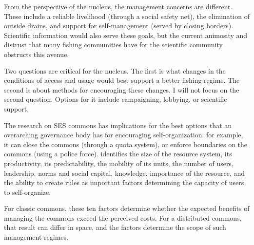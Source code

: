 \documentclass[12pt, oneside]{amsart}
\begin{document}
 
From the perspective of the nucleus, the management concerns are different.  These include a reliable livelihood (through a social safety net), the elimination of outside drains, and support for self-management (served by closing borders).  Scientific information would also serve these goals, but the current animosity and distrust that many fishing communities have for the scientific community obstructs this avenue.

Two questions are critical for the nucleus.  The first is what changes in the conditions of access and usage would best support a better fishing regime.  The second is about methods for encouraging these changes.  I will not focus on the second question.  Options for it include campaigning, lobbying, or scientific support.

The research on SES commons has implications for the best options that an overarching governance body has for encouraging self-organization: for example, it can close the commons (through a quota system), or enforce boundaries on the commons (using a police force).  \citet{ostrom2009general} identifies the size of the resource system, its productivity, its predictability, the mobility of its units, the number of users, leadership, norms and social capital, knowledge, importance of the resource, and the ability to create rules as important factors determining the capacity of users to self-organize.

For classic commons, these ten factors determine whether the expected benefits of managing the commons exceed the perceived costs.  For a distributed commons, that result can differ in space, and the factors determine the scope of such management regimes.


%

\newpage
\singlespacing
{}

\end{document}
